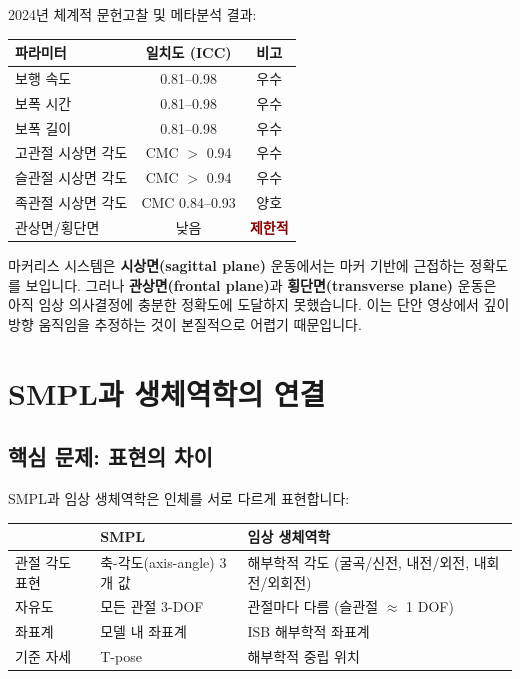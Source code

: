 \documentclass[11pt, a4paper]{report}
\begin{document}
2024년 체계적 문헌고찰 및 메타분석 결과:

\begin{center}
\renewcommand{\arraystretch}{1.3}
\begin{tabular}{p{4cm}cc}
\toprule
\textbf{파라미터} & \textbf{일치도 (ICC)} & \textbf{비고} \\
\midrule
보행 속도 & 0.81--0.98 & 우수 \\
보폭 시간 & 0.81--0.98 & 우수 \\
보폭 길이 & 0.81--0.98 & 우수 \\
고관절 시상면 각도 & CMC $>$ 0.94 & 우수 \\
슬관절 시상면 각도 & CMC $>$ 0.94 & 우수 \\
족관절 시상면 각도 & CMC 0.84--0.93 & 양호 \\
관상면/횡단면 & 낮음 & \textcolor{darkred}{\textbf{제한적}} \\
\bottomrule
\end{tabular}
\end{center}

\begin{clinicalnote}
마커리스 시스템은 \textbf{시상면(sagittal plane)} 운동에서는 마커 기반에 근접하는 정확도를 보입니다. 그러나 \textbf{관상면(frontal plane)}과 \textbf{횡단면(transverse plane)} 운동은 아직 임상 의사결정에 충분한 정확도에 도달하지 못했습니다. 이는 단안 영상에서 깊이 방향 움직임을 추정하는 것이 본질적으로 어렵기 때문입니다.
\end{clinicalnote}


\chapter{SMPL과 생체역학의 연결}
\label{ch:smpl_biomech}

\section{핵심 문제: 표현의 차이}

SMPL과 임상 생체역학은 인체를 서로 다르게 표현합니다:

\begin{center}
\renewcommand{\arraystretch}{1.3}
\begin{tabular}{p{3cm}p{5cm}p{5cm}}
\toprule
& \textbf{SMPL} & \textbf{임상 생체역학} \\
\midrule
관절 각도 표현 & 축-각도(axis-angle) 3개 값 & 해부학적 각도 (굴곡/신전, 내전/외전, 내회전/외회전) \\
자유도 & 모든 관절 3-DOF & 관절마다 다름 (슬관절 $\approx$ 1 DOF) \\
좌표계 & 모델 내 좌표계 & ISB 해부학적 좌표계 \\
기준 자세 & T-pose & 해부학적 중립 위치 \\
\bottomrule
\end{tabular}
\end{center}
\end{document}
